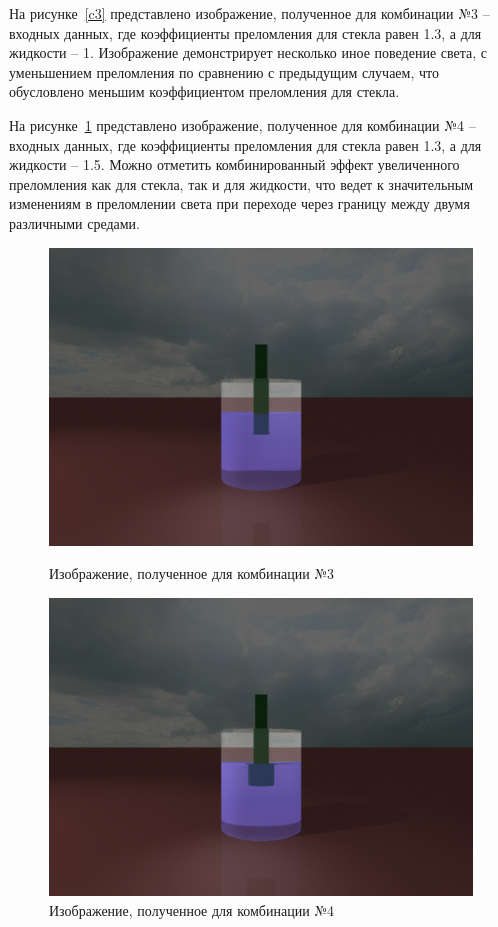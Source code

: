 На рисунке~\ref{c3} представлено изображение, полученное для комбинации №3 -- входных данных, где коэффициенты преломления для стекла равен 1.3, а для жидкости -- 1. Изображение демонстрирует несколько иное поведение света, с уменьшением преломления по сравнению с предыдущим случаем, что обусловлено меньшим коэффициентом преломления для стекла.

На рисунке~\ref{c4} представлено изображение, полученное для комбинации №4 -- входных данных, где коэффициенты преломления для стекла равен 1.3, а для жидкости -- 1.5. Можно отметить комбинированный эффект увеличенного преломления как для стекла, так и для жидкости, что ведет к значительным изменениям в преломлении света при переходе через границу между двумя различными средами.

\begin{figure}[ht!]
	\begin{center}
		\begin{minipage}{0.45\textwidth}
			\centering
			\includegraphics[scale=0.2]{img/example-3.png}
			\caption{Изображение, полученное для комбинации №3}
			\label{c3}
		\end{minipage}\hfill
		\begin{minipage}{0.45\textwidth}
			\centering
			\includegraphics[scale=0.2]{img/example-4.png}
			\caption{Изображение, полученное для комбинации №4}
			\label{c4}
		\end{minipage}
	\end{center}
\end{figure}

